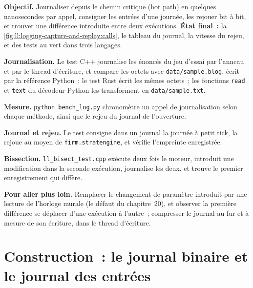 \begin{tutorial}
\textbf{Objectif.} Journaliser depuis le chemin critique (hot path) en quelques nanosecondes par appel, consigner les entrées d'une journée, les rejouer bit à bit, et trouver une
différence introduite entre deux exécutions. \textbf{État final~:} la \cref{fig:ll:logging-capture-and-replay:calls}, le tableau du journal,
la vitesse du rejeu, et des tests au vert dans trois langages.
\begin{tutsteps}
\item \textbf{Journalisation.} Le test C++ journalise les énoncés du jeu d'essai par l'anneau et par le thread d'écriture, et compare les
octets avec \texttt{data/sample.blog}, écrit par la référence Python~; le test Rust écrit les mêmes octets~; les fonctions \texttt{read} et \texttt{text} du décodeur Python les transforment en
\texttt{data/sample.txt}.
\item \textbf{Mesure.} \texttt{python bench\_log.py} chronomètre un appel de journalisation selon chaque méthode, ainsi que le rejeu du journal de l'ouverture.
\item \textbf{Journal et rejeu.} Le test consigne dans un journal la journée à petit tick, la rejoue au moyen de \texttt{firm.stratengine}, et
vérifie l'empreinte enregistrée.
\item \textbf{Bissection.} \texttt{ll\_bisect\_test.cpp} exécute deux fois le moteur, introduit une modification dans la seconde exécution, journalise les deux, et
trouve le premier enregistrement qui diffère.
\end{tutsteps}
\textbf{Pour aller plus loin.} Remplacer le changement de paramètre introduit par une lecture de l'horloge murale (le défaut du chapitre~20), et observer la
première différence se déplacer d'une exécution à l'autre~; compresser le journal au fur et à mesure de son écriture, dans le thread d'écriture.
\end{tutorial}

\section{Construction~: le journal binaire et le journal des entrées}\label{bld:ll:logging-capture-and-replay:binlog}

